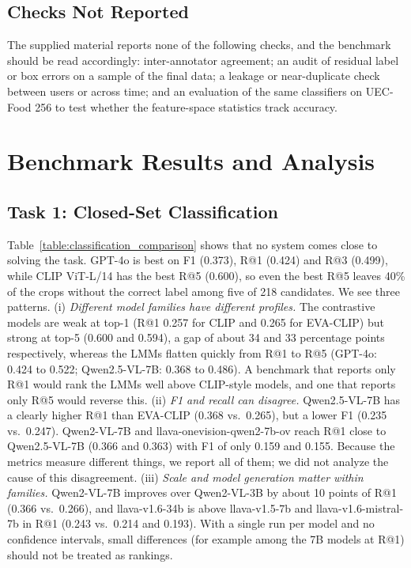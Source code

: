 \documentclass[sigconf, nonacm]{acmart}
\begin{document}
\subsection{Checks Not Reported}

The supplied material reports none of the following checks, and the benchmark should be read accordingly: inter-annotator agreement; an audit of residual label or box errors on a sample of the final data; a leakage or near-duplicate check between users or across time; and an evaluation of the same classifiers on UEC-Food 256 to test whether the feature-space statistics track accuracy.

\section{Benchmark Results and Analysis}

\subsection{Task 1: Closed-Set Classification}



Table~\ref{table:classification_comparison} shows that no system comes close to solving the task. GPT-4o is best on F1 (0.373), R@1 (0.424) and R@3 (0.499), while CLIP ViT-L/14 has the best R@5 (0.600), so even the best R@5 leaves 40\% of the crops without the correct label among five of 218 candidates. We see three patterns. (i) \emph{Different model families have different profiles.} The contrastive models are weak at top-1 (R@1 0.257 for CLIP and 0.265 for EVA-CLIP) but strong at top-5 (0.600 and 0.594), a gap of about 34 and 33 percentage points respectively, whereas the LMMs flatten quickly from R@1 to R@5 (GPT-4o: 0.424 to 0.522; Qwen2.5-VL-7B: 0.368 to 0.486). A benchmark that reports only R@1 would rank the LMMs well above CLIP-style models, and one that reports only R@5 would reverse this. (ii) \emph{F1 and recall can disagree.} Qwen2.5-VL-7B has a clearly higher R@1 than EVA-CLIP (0.368 vs.\ 0.265), but a lower F1 (0.235 vs.\ 0.247). Qwen2-VL-7B and llava-onevision-qwen2-7b-ov reach R@1 close to Qwen2.5-VL-7B (0.366 and 0.363) with F1 of only 0.159 and 0.155. Because the metrics measure different things, we report all of them; we did not analyze the cause of this disagreement. (iii) \emph{Scale and model generation matter within families.} Qwen2-VL-7B improves over Qwen2-VL-3B by about 10 points of R@1 (0.366 vs.\ 0.266), and llava-v1.6-34b is above llava-v1.5-7b and llava-v1.6-mistral-7b in R@1 (0.243 vs.\ 0.214 and 0.193). With a single run per model and no confidence intervals, small differences (for example among the 7B models at R@1) should not be treated as rankings.
\end{document}
